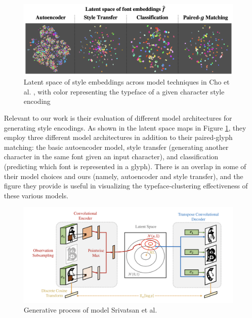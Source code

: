 \begin{figure}[]
    \centering
    \includegraphics[width=1\textwidth]{images/cho-latent-space.png}
    \caption{Latent space of style embeddings across model techniques in Cho et al. \cite{cho2022}, with color representing the typeface of a given character style encoding}
    \label{fig:cho-latent-space}
\end{figure}

Relevant to our work is their evaluation of different model architectures for generating style encodings. As shown in the latent space maps in Figure \ref{fig:cho-latent-space}, they employ three different model architectures in addition to their paired-glyph matching: the basic autoencoder model, style transfer (generating another character in the same font given an input character), and classification (predicting which font is represented in a glyph). There is an overlap in some of their model choices and ours (namely, autoencoder and style transfer), and the figure they provide is useful in visualizing the typeface-clustering effectiveness of these various models.

\begin{figure}[h]
    \centering
    \includegraphics[width=1\textwidth]{images/srivatsan-model.png}
    \caption{Generative process of model Srivatsan et al.}
    \label{fig:srivatsan-model}
\end{figure}

